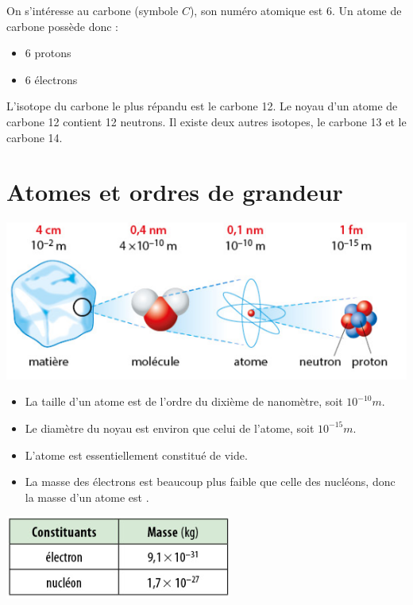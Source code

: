\documentclass[12pt,a4paper]{article}
\begin{document}
\begin{myex}
	On s'intéresse au carbone (symbole $C$), son numéro atomique est 6. Un atome de carbone possède donc :
	\begin{itemize}
		\item 6 protons
		\item 6 électrons
	\end{itemize}

	L'isotope du carbone le plus répandu est le carbone 12. Le noyau d'un atome de carbone 12 contient 12 neutrons. Il existe deux autres isotopes, le carbone 13 et le carbone 14.
\end{myex}


\section{Atomes et ordres de grandeur}

\begin{mybilan}
	
	\begin{center}
		\includegraphics[scale=0.75]{echelle}
	\end{center}

	\begin{itemize}
		\item La taille d'un atome est de l'ordre du dixième de nanomètre, soit $10^{-10} m$.
		\item Le diamètre du noyau est environ  que celui de l'atome, soit $10^{-15} m$.
		\item L'atome est essentiellement constitué de vide.
		\item La masse des électrons est beaucoup plus faible que celle des nucléons, donc la masse d'un atome est .
	\end{itemize}

	
		
		\begin{center}
			\includegraphics[scale=0.75]{masses}
		\end{center}
	
\end{mybilan}
\end{document}
